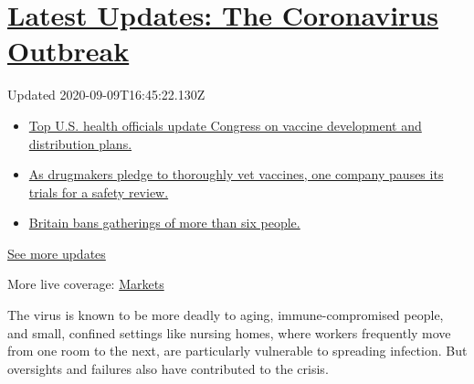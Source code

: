 \hypertarget{latest-updates-the-coronavirus-outbreak}{%
\section{\texorpdfstring{\href{https://www.nytimes3xbfgragh.onion/2020/09/09/world/covid-19-coronavirus.html?action=click\&pgtype=Article\&state=default\&region=MAIN_CONTENT_1\&context=storylines_live_updates}{Latest
Updates: The Coronavirus
Outbreak}}{Latest Updates: The Coronavirus Outbreak}}\label{latest-updates-the-coronavirus-outbreak}}

Updated 2020-09-09T16:45:22.130Z

\begin{itemize}
\tightlist
\item
  \href{https://www.nytimes3xbfgragh.onion/2020/09/09/world/covid-19-coronavirus.html?action=click\&pgtype=Article\&state=default\&region=MAIN_CONTENT_1\&context=storylines_live_updates\#link-279e24e2}{Top
  U.S. health officials update Congress on vaccine development and
  distribution plans.}
\item
  \href{https://www.nytimes3xbfgragh.onion/2020/09/09/world/covid-19-coronavirus.html?action=click\&pgtype=Article\&state=default\&region=MAIN_CONTENT_1\&context=storylines_live_updates\#link-5b0bf0d1}{As
  drugmakers pledge to thoroughly vet vaccines, one company pauses its
  trials for a safety review.}
\item
  \href{https://www.nytimes3xbfgragh.onion/2020/09/09/world/covid-19-coronavirus.html?action=click\&pgtype=Article\&state=default\&region=MAIN_CONTENT_1\&context=storylines_live_updates\#link-58edc4cb}{Britain
  bans gatherings of more than six people.}
\end{itemize}

\href{https://www.nytimes3xbfgragh.onion/2020/09/09/world/covid-19-coronavirus.html?action=click\&pgtype=Article\&state=default\&region=MAIN_CONTENT_1\&context=storylines_live_updates}{See
more updates}

More live coverage:
\href{https://www.nytimes3xbfgragh.onion/live/2020/09/09/business/stock-market-today-coronavirus?action=click\&pgtype=Article\&state=default\&region=MAIN_CONTENT_1\&context=storylines_live_updates}{Markets}

The virus is known to be more deadly to aging, immune-compromised
people, and small, confined settings like nursing homes, where workers
frequently move from one room to the next, are particularly vulnerable
to spreading infection. But oversights and failures also have
contributed to the crisis.

